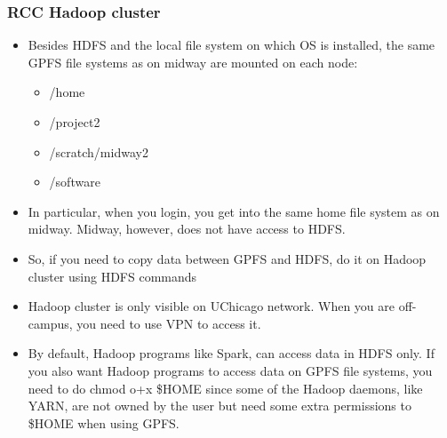 \documentclass{beamer}
\begin{document}
\begin{frame}
  \frametitle{RCC Hadoop cluster}
  \begin{itemize}
  \item Besides HDFS and the local file system on which OS is installed, the same GPFS file systems as on midway are mounted on each node:
    \begin{itemize}
    \item {\color{mycolorcli}/home}
    \item {\color{mycolorcli}/project2}
    \item {\color{mycolorcli}/scratch/midway2}
    \item {\color{mycolorcli}/software}
    \end{itemize}
  \item In particular, when you login, you get into the same home file system as on midway. Midway, however, does not have access to HDFS.
  \item So, if you need to copy data between GPFS and HDFS, do it on Hadoop cluster using HDFS commands
  \item Hadoop cluster is only visible on UChicago network. When you are off-campus, you need to use VPN to access it.
  \item By default, Hadoop programs like Spark, can access data in HDFS only.
    If you also want Hadoop programs to access data on GPFS file systems,
    you need to do
    {\color{mycolorcli}chmod o+x \$HOME}
    since some of the Hadoop daemons, like YARN, are not owned by the user but need
    some extra permissions to {\color{mycolorcli}\$HOME} when using GPFS.
  \end{itemize}
\end{frame}
\end{document}

